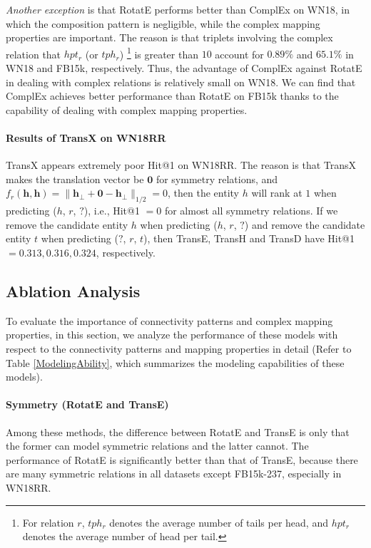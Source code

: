 \documentclass[conference]{IEEEtran}
\begin{document}
\textit{Another exception} is that RotatE performs better than ComplEx on WN18, in which the composition pattern is negligible, while the complex mapping properties are important. The reason is that triplets involving the complex relation that $hpt_r$ (or $tph_r$)
\footnote{
	For relation $r$, $tph_r$ denotes the average number of tails per head, and $hpt_r$ denotes the average number of head per tail.
} 
is greater than $10$ account for $0.89\%$ and $65.1\%$ in WN18 and FB15k, respectively. Thus, the advantage of ComplEx against RotatE in dealing with complex relations is relatively small on WN18. We can find that ComplEx achieves better performance than RotatE on FB15k thanks to the capability of dealing with complex mapping properties.

\paragraph*{Results of TransX on WN18RR}
TransX appears extremely poor Hit@1 on WN18RR. The reason is that TransX makes the translation vector be $\bm{0}$ for symmetry relations, and $f_{r}(\bm{h},\bm{h}) = \|\bm{h_{\bot}} + \bm{0} - \bm{h_{\bot}}\|_{1/2} = 0$, then the entity $h$ will rank at $1$ when predicting ($h$, $r$, $?$), i.e., Hit@1 $=0$ for almost all symmetry relations. If we remove the candidate entity $h$ when predicting ($h$, $r$, $?$) and remove the candidate entity $t$ when predicting ($?$, $r$, $t$), then TransE, TransH and TransD have Hit@1 $=0.313, 0.316, 0.324$, respectively.

\subsection{Ablation Analysis}
To evaluate the importance of connectivity patterns and complex mapping properties, in this section, we analyze the performance of these models with respect to the connectivity patterns and mapping properties in detail (Refer to Table \ref{ModelingAbility}, which summarizes the modeling capabilities of these models).

\paragraph{Symmetry (RotatE and TransE)}
Among these methods, the difference between RotatE and TransE is only that the former can model symmetric relations and the latter cannot. The performance of RotatE is significantly better than that of TransE, because there are many symmetric relations in all datasets except FB15k-237, especially in WN18RR.
\end{document}
